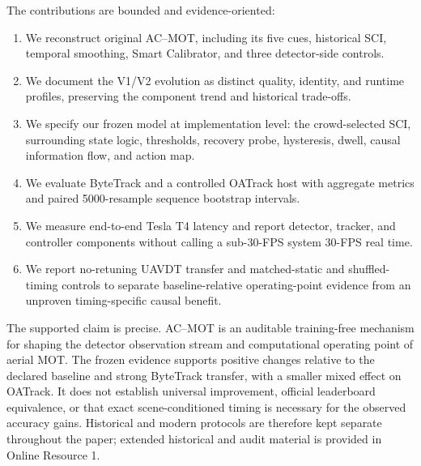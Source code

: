 The contributions are bounded and evidence-oriented:
\begin{enumerate}
\item We reconstruct original AC--MOT, including its five cues, historical SCI,
      temporal smoothing, Smart Calibrator, and three detector-side controls.
\item We document the V1/V2 evolution as distinct quality, identity, and runtime
      profiles, preserving the component trend and historical trade-offs.
\item We specify our frozen model at implementation level: the crowd-selected SCI,
      surrounding state logic, thresholds, recovery probe, hysteresis, dwell,
      causal information flow, and action map.
\item We evaluate ByteTrack and a controlled OATrack host with aggregate metrics
      and paired 5000-resample sequence bootstrap intervals.
\item We measure end-to-end Tesla T4 latency and report detector, tracker, and
      controller components without calling a sub-30-FPS system 30-FPS real
      time.
\item We report no-retuning UAVDT transfer and matched-static and shuffled-
      timing controls to separate baseline-relative operating-point evidence
      from an unproven timing-specific causal benefit.
\end{enumerate}

The supported claim is precise. AC--MOT is an auditable training-free mechanism
for shaping the detector observation stream and computational operating point
of aerial MOT. The frozen evidence supports positive changes relative to the
declared baseline and strong ByteTrack transfer, with a smaller mixed effect on
OATrack. It does not establish universal improvement, official leaderboard
equivalence, or that exact scene-conditioned timing is necessary for the
observed accuracy gains. Historical and modern protocols are therefore kept
separate throughout the paper; extended historical and audit material is
provided in Online Resource 1.

